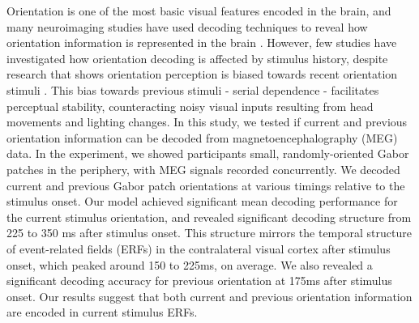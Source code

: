 \documentclass[../main.tex]{subfiles}
\begin{document}
Orientation is one of the most basic visual features encoded in the brain, and many neuroimaging studies have used decoding techniques to reveal how orientation information is represented in the brain \citep{haynes_rees_2005, kamitani_tong_2005, GARCIA2013515, cichy_ramirez_pantazis_2015}. However, few studies have investigated how orientation decoding is affected by stimulus history, despite research that shows orientation perception is biased towards recent orientation stimuli \citep{fischer_whitney_2014}. This bias towards previous stimuli - serial dependence - facilitates perceptual stability, counteracting noisy visual inputs resulting from head movements and lighting changes. In this study, we tested if current and previous orientation information can be decoded from magnetoencephalography (MEG) data. In the experiment, we showed participants small, randomly-oriented Gabor patches in the periphery, with MEG signals recorded concurrently. We decoded current and previous Gabor patch orientations at various timings relative to the stimulus onset. Our model achieved significant mean decoding performance for the current stimulus orientation, and revealed significant decoding structure from 225 to 350 ms after stimulus onset. This structure mirrors the temporal structure of event-related fields (ERFs) in the contralateral visual cortex after stimulus onset, which peaked around 150 to 225ms, on average. We also revealed a significant decoding accuracy for previous orientation at 175ms after stimulus onset. Our results suggest that both current and previous orientation information are encoded in current stimulus ERFs.
\end{document}
